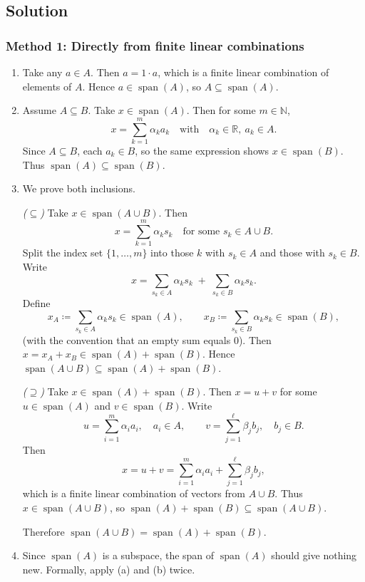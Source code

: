 \documentclass[12pt]{article}
\newcommand{\R}{\mathbb{R}}
\newcommand{\Span}{\operatorname{span}}
\begin{document}
\subsection{Solution}

\subsubsection{Method 1: Directly from finite linear combinations}

\begin{enumerate}[label=(\alph*)]
\item Take any \(a\in A\).
Then \(a=1\cdot a\), which is a finite linear combination of elements of \(A\).
Hence \(a\in\Span(A)\), so \(A\subseteq \Span(A)\).

\item Assume \(A\subseteq B\).
Take \(x\in\Span(A)\). Then for some \(m\in\mathbb{N}\),
\[
x=\sum_{k=1}^m \alpha_k a_k
\quad\text{with}\quad
\alpha_k\in\R,\ a_k\in A.
\]
Since \(A\subseteq B\), each \(a_k\in B\), so the same expression shows \(x\in\Span(B)\).
Thus \(\Span(A)\subseteq \Span(B)\).

\item We prove both inclusions.

\emph{(\(\subseteq\))} Take \(x\in \Span(A\cup B)\).
Then
\[
x=\sum_{k=1}^m \alpha_k s_k
\quad\text{for some }s_k\in A\cup B.
\]
Split the index set \(\{1,\ldots,m\}\) into those \(k\) with \(s_k\in A\) and those with \(s_k\in B\).
Write
\[
x=\sum_{s_k\in A}\alpha_k s_k\;+\;\sum_{s_k\in B}\alpha_k s_k.
\]
Define
\[
x_A\coloneqq \sum_{s_k\in A}\alpha_k s_k\in \Span(A),
\qquad
x_B\coloneqq \sum_{s_k\in B}\alpha_k s_k\in \Span(B),
\]
(with the convention that an empty sum equals \(0\)).
Then \(x=x_A+x_B\in \Span(A)+\Span(B)\).
Hence \(\Span(A\cup B)\subseteq \Span(A)+\Span(B)\).

\emph{(\(\supseteq\))} Take \(x\in \Span(A)+\Span(B)\).
Then \(x=u+v\) for some \(u\in\Span(A)\) and \(v\in\Span(B)\).
Write
\[
u=\sum_{i=1}^m \alpha_i a_i,\quad a_i\in A,
\qquad
v=\sum_{j=1}^\ell \beta_j b_j,\quad b_j\in B.
\]
Then
\[
x=u+v=\sum_{i=1}^m \alpha_i a_i+\sum_{j=1}^\ell \beta_j b_j,
\]
which is a finite linear combination of vectors from \(A\cup B\).
Thus \(x\in \Span(A\cup B)\), so \(\Span(A)+\Span(B)\subseteq \Span(A\cup B)\).

Therefore \(\Span(A\cup B)=\Span(A)+\Span(B)\).

\item Since \(\Span(A)\) is a subspace, the span of \(\Span(A)\) should give nothing new.
Formally, apply (a) and (b) twice.


\end{enumerate}
\end{document}
